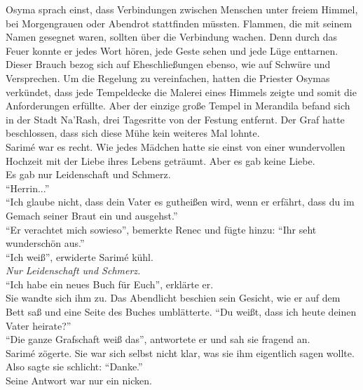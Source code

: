 Osyma sprach einst, dass Verbindungen zwischen Menschen unter freiem Himmel, bei Morgengrauen oder 
Abendrot stattfinden müssten. Flammen, die mit seinem Namen gesegnet waren, sollten über die 
Verbindung wachen. Denn durch das Feuer konnte er jedes Wort hören, jede Geste sehen und jede Lüge 
enttarnen. Dieser Brauch bezog sich auf Eheschließungen ebenso, wie auf Schwüre und Versprechen. Um 
die Regelung zu vereinfachen, hatten die Priester Osymas verkündet, dass jede Tempeldecke die 
Malerei eines Himmels zeigte und somit die Anforderungen erfüllte. Aber der einzige große Tempel in 
Merandila befand sich in der Stadt Na'Rash, drei Tagesritte von der Festung entfernt. Der Graf hatte 
beschlossen, dass sich diese Mühe kein weiteres Mal lohnte. \\
Sarimé war es recht. Wie jedes Mädchen hatte sie einst von einer wundervollen Hochzeit mit der 
Liebe ihres Lebens geträumt. Aber es gab keine Liebe.\\
Es gab nur Leidenschaft und Schmerz.\\
``Herrin...''\\
``Ich glaube nicht, dass dein Vater es gutheißen wird, wenn er erfährt, dass du im Gemach seiner 
Braut ein und ausgehst.''\\
``Er verachtet mich sowieso'', bemerkte Renec und fügte hinzu: ``Ihr seht wunderschön aus.''\\
``Ich weiß'', erwiderte Sarimé kühl.\\
\textit{Nur Leidenschaft und Schmerz.}\\
``Ich habe ein neues Buch für Euch'', erklärte er.\\
Sie wandte sich ihm zu. Das Abendlicht beschien sein Gesicht, wie er auf dem Bett saß und eine 
Seite des Buches umblätterte. ``Du weißt, dass ich heute deinen Vater heirate?''\\
``Die ganze Grafschaft weiß das'', antwortete er und sah sie fragend an.\\
Sarimé zögerte. Sie war sich selbst nicht klar, was sie ihm eigentlich sagen wollte. Also sagte sie 
schlicht: ``Danke.''\\
Seine Antwort war nur ein nicken.


